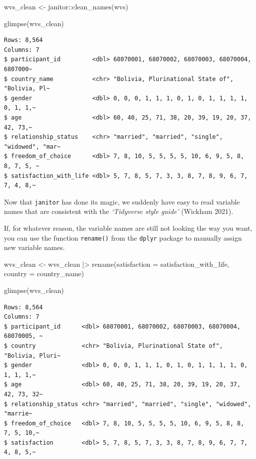 \documentclass[
  letterpaper,
]{krantz}
\makeatletter
\newenvironment{Shaded}{\begin{snugshade}}{\end{snugshade}}
\newcommand{\AttributeTok}[1]{\textcolor[rgb]{0.40,0.45,0.13}{#1}}
\newcommand{\FunctionTok}[1]{\textcolor[rgb]{0.28,0.35,0.67}{#1}}
\newcommand{\NormalTok}[1]{\textcolor[rgb]{0.00,0.23,0.31}{#1}}
\newcommand{\OtherTok}[1]{\textcolor[rgb]{0.00,0.23,0.31}{#1}}
\newcommand{\SpecialCharTok}[1]{\textcolor[rgb]{0.37,0.37,0.37}{#1}}
\newenvironment{kframe}{%
\medskip{}
\setlength{\fboxsep}{.8em}
 \def\at@end@of@kframe{}%
 \ifinner\ifhmode%
  \def\at@end@of@kframe{\end{minipage}}%
  \begin{minipage}{\columnwidth}%
 \fi\fi%
 \def\FrameCommand##1{\hskip\@totalleftmargin \hskip-\fboxsep
 \colorbox{shadecolor}{##1}\hskip-\fboxsep
     \hskip-\linewidth \hskip-\@totalleftmargin \hskip\columnwidth}%
 \MakeFramed {\advance\hsize-\width
   \@totalleftmargin\z@ \linewidth\hsize
   \@setminipage}}%
 {\par\unskip\endMakeFramed%
 \at@end@of@kframe}
\renewenvironment{Shaded}{\begin{kframe}}{\end{kframe}}
\makeatother
\begin{document}
\begin{Shaded}
\begin{Highlighting}[]
\NormalTok{wvs\_clean }\OtherTok{\textless{}{-}}\NormalTok{ janitor}\SpecialCharTok{::}\FunctionTok{clean\_names}\NormalTok{(wvs)}

\FunctionTok{glimpse}\NormalTok{(wvs\_clean)}
\end{Highlighting}
\end{Shaded}

\begin{verbatim}
Rows: 8,564
Columns: 7
$ participant_id         <dbl> 68070001, 68070002, 68070003, 68070004, 6807000~
$ country_name           <chr> "Bolivia, Plurinational State of", "Bolivia, Pl~
$ gender                 <dbl> 0, 0, 0, 1, 1, 1, 0, 1, 0, 1, 1, 1, 1, 0, 1, 1,~
$ age                    <dbl> 60, 40, 25, 71, 38, 20, 39, 19, 20, 37, 42, 73,~
$ relationship_status    <chr> "married", "married", "single", "widowed", "mar~
$ freedom_of_choice      <dbl> 7, 8, 10, 5, 5, 5, 5, 10, 6, 9, 5, 8, 8, 7, 5, ~
$ satisfaction_with_life <dbl> 5, 7, 8, 5, 7, 3, 3, 8, 7, 8, 9, 6, 7, 7, 4, 8,~
\end{verbatim}

Now that \texttt{janitor} has done its magic, we suddenly have easy to
read variable names that are consistent with the \emph{`Tidyverse style
guide'} (Wickham 2021).

If, for whatever reason, the variable names are still not looking the
way you want, you can use the function \texttt{rename()} from the
\texttt{dplyr} package to manually assign new variable names.

\begin{Shaded}
\begin{Highlighting}[]
\NormalTok{wvs\_clean }\OtherTok{\textless{}{-}} 
\NormalTok{  wvs\_clean }\SpecialCharTok{|\textgreater{}}
  \FunctionTok{rename}\NormalTok{(}\AttributeTok{satisfaction =}\NormalTok{ satisfaction\_with\_life,}
         \AttributeTok{country =}\NormalTok{ country\_name)}

\FunctionTok{glimpse}\NormalTok{(wvs\_clean)}
\end{Highlighting}
\end{Shaded}

\begin{verbatim}
Rows: 8,564
Columns: 7
$ participant_id      <dbl> 68070001, 68070002, 68070003, 68070004, 68070005, ~
$ country             <chr> "Bolivia, Plurinational State of", "Bolivia, Pluri~
$ gender              <dbl> 0, 0, 0, 1, 1, 1, 0, 1, 0, 1, 1, 1, 1, 0, 1, 1, 1,~
$ age                 <dbl> 60, 40, 25, 71, 38, 20, 39, 19, 20, 37, 42, 73, 32~
$ relationship_status <chr> "married", "married", "single", "widowed", "marrie~
$ freedom_of_choice   <dbl> 7, 8, 10, 5, 5, 5, 5, 10, 6, 9, 5, 8, 8, 7, 5, 10,~
$ satisfaction        <dbl> 5, 7, 8, 5, 7, 3, 3, 8, 7, 8, 9, 6, 7, 7, 4, 8, 5,~
\end{verbatim}
\end{document}
